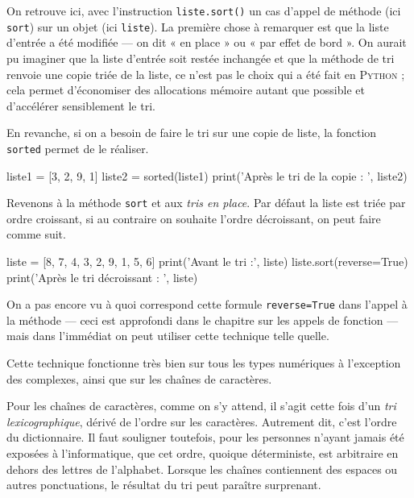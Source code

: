 On retrouve ici, avec l'instruction \texttt{liste.sort()} un cas d'appel de méthode (ici \texttt{sort}) sur un objet (ici \texttt{liste}).
La première chose à remarquer est que la liste d'entrée a été modifiée --- on dit « en place » ou « par effet de bord ».
On aurait pu imaginer que la liste d'entrée soit restée inchangée et que la méthode de tri renvoie une copie triée de la liste, ce n'est pas le choix qui a été fait en \textsc{Python} ; cela permet d'économiser des allocations mémoire autant que possible et d'accélérer sensiblement le tri.

En revanche, si on a besoin de faire le tri sur une copie de liste, la fonction \texttt{sorted} permet de le réaliser.

\begin{idleconsole}
\begin{pyconsole}
liste1 = [3, 2, 9, 1]
liste2 = sorted(liste1)
print('Après le tri de la copie : ', liste2)
\end{pyconsole}
\end{idleconsole}

Revenons à la méthode \texttt{sort} et aux \textit{tris en place}. Par défaut la liste est triée par ordre croissant, si au contraire on souhaite l'ordre décroissant, on peut faire comme suit.

\begin{idleconsole}
\begin{pyconsole}
liste = [8, 7, 4, 3, 2, 9, 1, 5, 6]
print('Avant le tri :', liste)
liste.sort(reverse=True)
print('Après le tri décroissant : ', liste)
\end{pyconsole}
\end{idleconsole}

On a pas encore vu à quoi correspond cette formule \texttt{reverse=True} dans l'appel à la méthode --- ceci est approfondi dans le chapitre sur les appels de fonction --- mais dans l'immédiat on peut utiliser cette technique telle quelle.

Cette technique fonctionne très bien sur tous les types numériques à l'exception des complexes, ainsi que sur les chaînes de caractères. 

Pour les chaînes de caractères, comme on s'y attend, il s'agit cette fois d'un \emph{tri lexicographique}, dérivé de l'ordre sur les caractères. Autrement dit, c'est l'ordre du dictionnaire. Il faut souligner toutefois, pour les personnes n'ayant jamais été exposées à l'informatique, que cet ordre, quoique déterministe, est arbitraire en dehors des lettres de l'alphabet.
Lorsque les chaînes contiennent des espaces ou autres ponctuations, le résultat du tri peut paraître surprenant.

